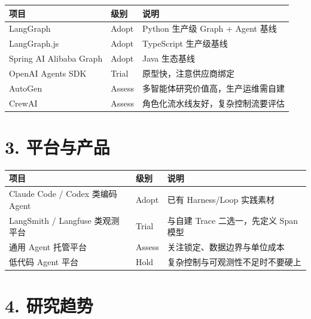 \documentclass[9pt,a4paper,twocolumn]{ctexart}
\begin{document}
{\footnotesize
\begin{tabular}{|p{}|p{}|p{}|}
\hline
\textbf{项目} & \textbf{级别} & \textbf{说明} \\
\hline
LangGraph & Adopt & Python 生产级 Graph + Agent 基线 \\
\hline
LangGraph.js & Adopt & TypeScript 生产级基线 \\
\hline
Spring AI Alibaba Graph & Adopt & Java 生态基线 \\
\hline
OpenAI Agents SDK & Trial & 原型快，注意供应商绑定 \\
\hline
AutoGen & Assess & 多智能体研究价值高，生产运维需自建 \\
\hline
CrewAI & Assess & 角色化流水线友好，复杂控制流要评估 \\
\hline
\end{tabular}
}



\section*{3. 平台与产品}

{\footnotesize
\begin{tabular}{|p{}|p{}|p{}|}
\hline
\textbf{项目} & \textbf{级别} & \textbf{说明} \\
\hline
Claude Code / Codex 类编码 Agent & Adopt & 已有 Harness/Loop 实践素材 \\
\hline
LangSmith / Langfuse 类观测平台 & Trial & 与自建 Trace 二选一，先定义 Span 模型 \\
\hline
通用 Agent 托管平台 & Assess & 关注锁定、数据边界与单位成本 \\
\hline
低代码 Agent 平台 & Hold & 复杂控制与可观测性不足时不要硬上 \\
\hline
\end{tabular}
}



\section*{4. 研究趋势}
\end{document}
